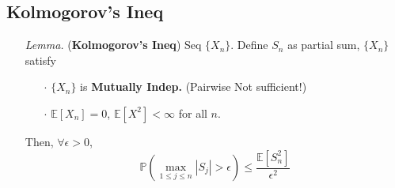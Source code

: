 \documentclass[a4paper,12pt,twoside]{book}
\begin{document}
\subsection{Kolmogorov's Ineq}
\begin{itemize}
	\item[\textit{Lemma.}] (\textbf{Kolmogorov's Ineq}) Seq $\{X_n\}$. Define $S_n$ as partial sum, $\{X_n\}$ satisfy
	\begin{itemize}
		\item[$\cdot$] $\{X_n\}$ is \textbf{Mutually Indep.} (Pairwise Not sufficient!)
		\item[$\cdot$] $\mathbb{E}\left[X_n\right]=0$, $\mathbb{E}\left[X^2\right]<\infty$ for all $n$.
	\end{itemize}
	Then, $\forall \epsilon>0$, 
	\begin{equation}
		\mathbb{P}\left(\max\limits_{1\leq j\leq n}|S_j|>\epsilon\right)\leq \frac{\mathbb{E}\left[S_n^2\right]}{\epsilon^2}
	\end{equation}


\end{itemize}
\end{document}
